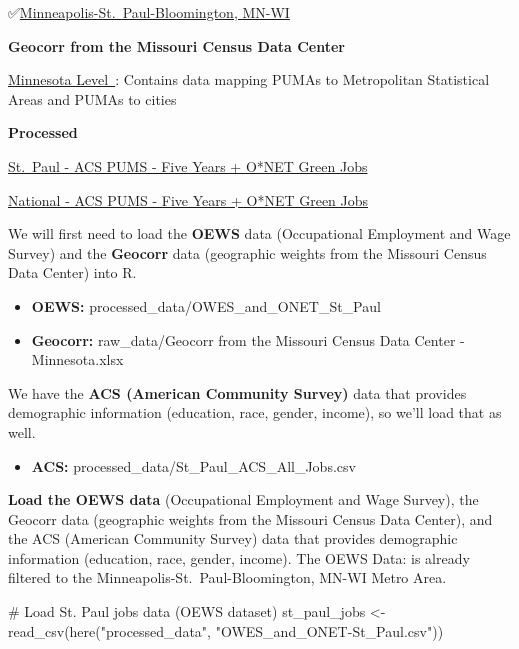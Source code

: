 \documentclass[
  letterpaper,
  DIV=11,
  numbers=noendperiod]{scrartcl}
\newenvironment{Shaded}{\begin{snugshade}}{\end{snugshade}}
\newcommand{\CommentTok}[1]{\textcolor[rgb]{0.37,0.37,0.37}{#1}}
\newcommand{\FunctionTok}[1]{\textcolor[rgb]{0.28,0.35,0.67}{#1}}
\newcommand{\NormalTok}[1]{\textcolor[rgb]{0.00,0.23,0.31}{#1}}
\newcommand{\OtherTok}[1]{\textcolor[rgb]{0.00,0.23,0.31}{#1}}
\newcommand{\StringTok}[1]{\textcolor[rgb]{0.13,0.47,0.30}{#1}}
\providecommand{\tightlist}{%
  \setlength{\itemsep}{0pt}\setlength{\parskip}{0pt}}\usepackage{longtable,booktabs,array}
\begin{document}
✅\href{https://docs.google.com/spreadsheets/d/105RYiRn-1LIVC-iUdCD3fCKROfOGH_M62s45gbo7GFM/edit?gid=2141627594\#gid=2141627594}{Minneapolis-St.~Paul-Bloomington,
MN-WI}

\textbf{Geocorr from the Missouri Census Data Center}

\href{https://docs.google.com/spreadsheets/d/1wRr-jATTjaXpErUfSCAZsoSn-lt1-TZtWv_Hoq2C29Q/edit?gid=1877088889\#gid=1877088889}{Minnesota
Level~}: Contains data mapping PUMAs to Metropolitan Statistical Areas
and PUMAs to cities

\textbf{Processed}~

\href{https://drive.google.com/file/d/1uyRoXlExkExjlJytEh8meqD3D--4Hwj4/view?usp=drive_link}{St.~Paul
- ACS PUMS - Five Years + O*NET Green Jobs}

\href{https://drive.google.com/file/d/1C3opSLifg144MIYnISHmf7wwZuAe2TQJ/view?usp=drive_link}{National
- ACS PUMS - Five Years + O*NET Green Jobs}

We will first need to load the \textbf{OEWS} data (Occupational
Employment and Wage Survey) and the \textbf{Geocorr} data (geographic
weights from the Missouri Census Data Center) into R.

\begin{itemize}
\item
  \textbf{OEWS:} processed\_data/OWES\_and\_ONET\_St\_Paul
\item
  \textbf{Geocorr:} raw\_data/Geocorr from the Missouri Census Data
  Center - Minnesota.xlsx
\end{itemize}

We have the \textbf{ACS (American Community Survey)} data that provides
demographic information (education, race, gender, income), so we'll load
that as well.

\begin{itemize}
\tightlist
\item
  \textbf{ACS:} processed\_data/St\_Paul\_ACS\_All\_Jobs.csv
\end{itemize}

\textbf{Load the OEWS data} (Occupational Employment and Wage Survey),
the Geocorr data (geographic weights from the Missouri Census Data
Center), and the ACS (American Community Survey) data that provides
demographic information (education, race, gender, income). The OEWS
Data: is already filtered to the Minneapolis-St.~Paul-Bloomington, MN-WI
Metro Area.

\begin{Shaded}
\begin{Highlighting}[]
\CommentTok{\# Load St. Paul jobs data (OEWS dataset)}
\NormalTok{st\_paul\_jobs }\OtherTok{\textless{}{-}} \FunctionTok{read\_csv}\NormalTok{(}\FunctionTok{here}\NormalTok{(}\StringTok{"processed\_data"}\NormalTok{, }\StringTok{"OWES\_and\_ONET{-}St\_Paul.csv"}\NormalTok{))}
\end{Highlighting}
\end{Shaded}
\end{document}
